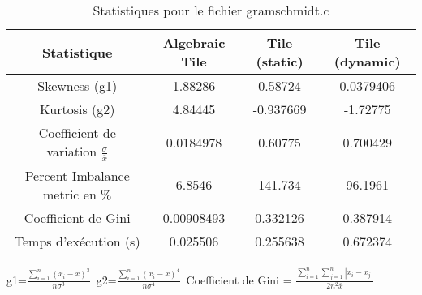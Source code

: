 \documentclass{article}
\begin{document}
\begin{table}[htbp]
  \centering
  \caption{Statistiques pour le fichier gramschmidt.c}
  \begin{tabular}{|c|c|c|c|}
    \hline
    Statistique & Algebraic Tile & Tile (static) & Tile (dynamic) \\ 
    \hline
    Skewness (g1)  & 1.88286 & 0.58724 & 0.0379406 \\ 
    Kurtosis (g2)  & 4.84445 & -0.937669 & -1.72775 \\ 
    Coefficient de variation $ \frac{\sigma}{\overline{x}} $ & 0.0184978 & 0.60775 & 0.700429\\ 
    Percent Imbalance metric en \% & 6.8546 & 141.734 & 96.1961\\ 
    Coefficient de Gini  & 0.00908493 & 0.332126 & 0.387914\\ 
    Temps d'exécution (s) &  0.025506    &  0.255638   &  0.672374   \\ 

    \hline
  \end{tabular}
\end{table}
g1=$ \frac{\sum_{i=1}^{n} (x_i - \overline{x})^3}{n\sigma^3} $\
g2=$ \frac{\sum_{i=1}^{n} (x_i - \overline{x})^4}{n\sigma^4} $\
Coefficient de Gini = $ \frac{\sum_{i=1}^{n}\sum_{j=1}^{n} |x_i - x_j|}{2n^2\overline{x}} $\
\newpage
\end{document}
